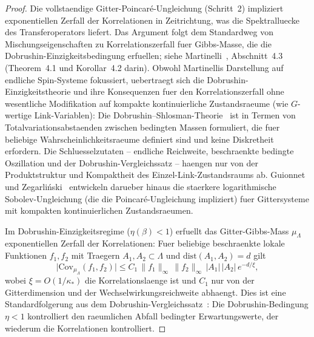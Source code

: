 \documentclass[12pt,a4paper]{article}
\theoremstyle{definition}
\theoremstyle{plain}
\theoremstyle{remark}
\begin{document}
\begin{proof}
Die vollstaendige Gitter-Poincar\'e-Ungleichung (Schritt~2) impliziert exponentiellen Zerfall der Korrelationen in Zeitrichtung, was die Spektralluecke des Transferoperators liefert. Das Argument folgt dem Standardweg von Mischungseigenschaften zu Korrelationszerfall fuer Gibbs-Masse, die die Dobrushin-Einzigkeitsbedingung erfuellen; siehe Martinelli~\cite{Martinelli1999}, Abschnitt~4.3 (Theorem~4.1 und Korollar~4.2 darin). Obwohl Martinellis Darstellung auf endliche Spin-Systeme fokussiert, uebertraegt sich die Dobrushin-Einzigkeitstheorie und ihre Konsequenzen fuer den Korrelationszerfall ohne wesentliche Modifikation auf kompakte kontinuierliche Zustandsraeume (wie $G$-wertige Link-Variablen): Die Dobrushin--Shlosman-Theorie~\cite{DobrushinShlosman1985} ist in Termen von Totalvariationsabstaenden zwischen bedingten Massen formuliert, die fuer beliebige Wahrscheinlichkeitsraeume definiert sind und keine Diskretheit erfordern. Die Schluesselzutaten -- endliche Reichweite, beschraenkte bedingte Oszillation und der Dobrushin-Vergleichssatz -- haengen nur von der Produktstruktur und Kompaktheit des Einzel-Link-Zustandsraums ab. Guionnet und Zegar\-li\'nski~\cite{GuionnetZegarlinski2003} entwickeln darueber hinaus die staerkere logarithmische Sobolev-Ungleichung (die die Poincar\'e-Ungleichung impliziert) fuer Gittersysteme mit kompakten kontinuierlichen Zustandsraeumen.

Im Dobrushin-Einzigkeitsregime ($\eta(\beta) < 1$) erfuellt das Gitter-Gibbs-Mass $\mu_\Lambda$ exponentiellen Zerfall der Korrelationen: Fuer beliebige beschraenkte lokale Funktionen $f_1, f_2$ mit Traegern $A_1, A_2 \subset \Lambda$ und $\mathrm{dist}(A_1, A_2) = d$ gilt
\begin{equation}\label{eq:corr-decay-martinelli}
    \bigl|\mathrm{Cov}_{\mu_\Lambda}(f_1, f_2)\bigr| \leq C_1\,\|f_1\|_\infty\,\|f_2\|_\infty\,|A_1|\,|A_2|\,e^{-d/\xi},
\end{equation}
wobei $\xi = O(1/\kappa_*)$ die Korrelationslaenge ist und $C_1$ nur von der Gitterdimension und der Wechselwirkungsreichweite abhaengt. Dies ist eine Standardfolgerung aus dem Dobrushin-Vergleichssatz~\cite{DobrushinShlosman1985, Martinelli1999, GuionnetZegarlinski2003}: Die Dobrushin-Bedingung $\eta < 1$ kontrolliert den raeumlichen Abfall bedingter Erwartungswerte, der wiederum die Korrelationen kontrolliert.


\end{proof}
\end{document}
